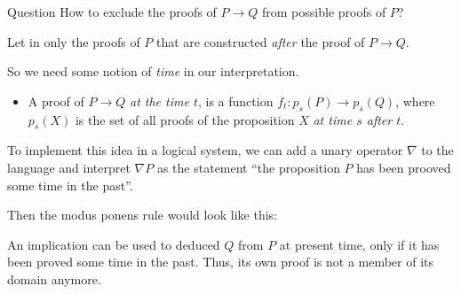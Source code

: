 \documentclass[handout]{beamer}
\begin{document}
\begin{frame}{\subIdea}

	\begin{block}{Question}
		How to exclude the proofs of $P \rightarrow Q$ from possible proofs of $P$?

		\quad Let in only the proofs of $P$ that are constructed \emph{after} the proof of $P \rightarrow Q$.
	\end{block}

	So we need some notion of \emph{time} in our interpretation.

	\begin{itemize}
		\large
		\item A proof of $P \rightarrow Q$ \emph{at the time $t$}, is a function $f_t : p_s(P) \rightarrow p_s(Q)$, where $p_s(X)$ is the set of all proofs of the proposition $X$ \emph{at time $s$ after $t$}.
	\end{itemize}
\end{frame}

\begin{frame}{\subIdea}
	To implement this idea in a logical system, we can add a unary operator $\nabla$ to the language and interpret $\nabla P$ as the statement ``the proposition $P$ has been prooved some time in the past''.

	Then the modus ponens rule would look like this:
	
	\begin{prooftree}
	\end{prooftree}

	An implication can be used to deduced $Q$ from $P$ at present time, only if it has been proved some time in the past. Thus, its own proof is not a member of its domain anymore.
\end{frame}
\end{document}
